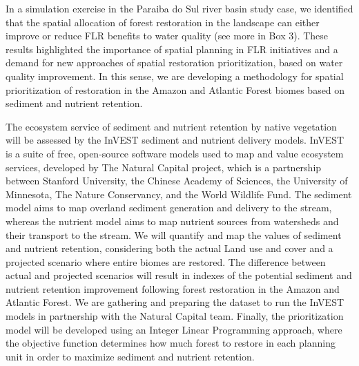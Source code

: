 In a simulation exercise in the Paraiba do Sul river basin study case, we identified that the spatial allocation of forest restoration in the landscape can either improve or reduce FLR benefits to water quality (see more in Box 3). These results highlighted the importance of spatial planning in FLR initiatives and a demand for new approaches of spatial restoration prioritization, based on water quality improvement. In this sense, we are developing a methodology for spatial prioritization of restoration in the Amazon and Atlantic Forest biomes based on sediment and nutrient retention. 

The ecosystem service of sediment and nutrient retention by native vegetation will be assessed by the InVEST sediment and nutrient delivery models. InVEST is a suite of free, open-source software models used to map and value ecosystem services, developed by The Natural Capital project, which is a partnership between Stanford University, the Chinese Academy of Sciences, the University of Minnesota, The Nature Conservancy, and the World Wildlife Fund. The sediment model aims to map overland sediment generation and delivery to the stream, whereas the nutrient model aims to map nutrient sources from watersheds and their transport to the stream. We will quantify and map the values of sediment and nutrient retention, considering both the actual Land use and cover and a projected scenario where entire biomes are restored. The difference between actual and projected scenarios will result in indexes of the potential sediment and nutrient retention improvement following forest restoration in the Amazon and Atlantic Forest. We are gathering and preparing the dataset to run the InVEST models in partnership with the Natural Capital team. Finally, the prioritization model will be developed using an Integer Linear Programming approach, where the objective function determines how much forest to restore in each planning unit in order to maximize sediment and nutrient retention. 

\newpage

